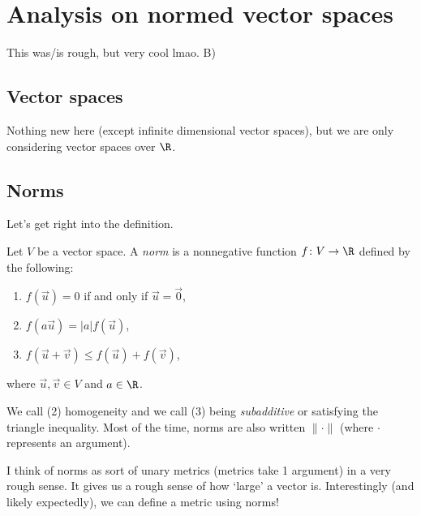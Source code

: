 \documentclass[class=article, crop=false]{standalone}
\begin{document}
\section{Analysis on normed vector spaces}

This was/is rough, but very cool lmao. B)











\subsection{Vector spaces}

Nothing new here (except infinite dimensional vector spaces), but we are only considering vector spaces over $\R$.











\subsection{Norms}

Let's get right into the definition.

\begin{defn}[Norm]
    Let $V$ be a vector space. A \textit{norm} is a nonnegative function $f \colon V \to \R$ defined by the following:
        \begin{enumerate}[(1)]
            \item $f(\vec u) = 0$ if and only if $\vec u =\vec 0$,
            \item $f(a\vec u) = |a| f(\vec u)$,
            \item $f(\vec u + \vec v) \leq f(\vec u) + f(\vec v)$,
        \end{enumerate}
    where $\vec u, \vec v \in V$ and $a \in \R$.
\end{defn}
\begin{rem}
    We call (2) homogeneity and we call (3) being \textit{subadditive} or satisfying the triangle inequality. Most of the time, norms are also written $\| \cdot \|$ (where $\cdot$ represents an argument).
\end{rem}

I think of norms as sort of unary metrics (metrics take 1 argument) in a very rough sense. It gives us a rough sense of how `large' a vector is. Interestingly (and likely expectedly), we can define a metric using norms!
\end{document}
